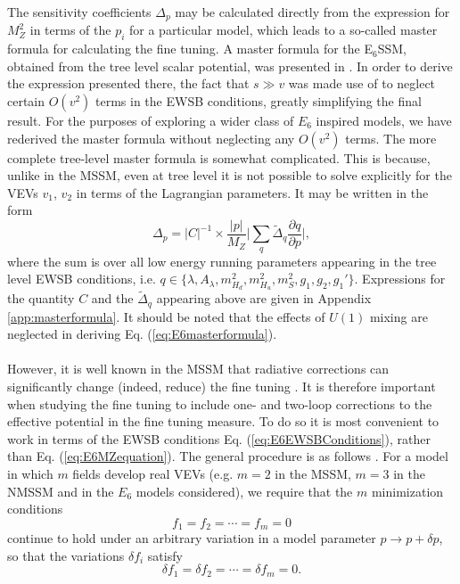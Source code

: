 \documentclass[preprint,amsmath,amssymb,aps,superscriptaddress,prd,showpacs,floatfix]{revtex4-1}
\newcommand{\be}{\begin{equation}}
\newcommand{\ee}{\end{equation}}
\begin{document}
The sensitivity coefficients $\Delta_p$ may be calculated directly from the expression for $M_Z^2$ in terms of the $p_i$ for a particular model, which leads to a so-called master formula for calculating the fine tuning. A master formula for the E$_6$SSM, obtained from the tree level scalar potential, was presented in \cite{Athron:2013ipa}. In order to derive the expression presented there, the fact that $s \gg v$ was made use of to neglect certain $O(v^2)$ terms in the EWSB conditions, greatly simplifying the final result. For the purposes of exploring a wider class of $E_6$ inspired models, we have rederived the master formula without neglecting any $O(v^2)$ terms. The more complete tree-level master formula is somewhat complicated. This is because, unlike in the MSSM, even at tree level it is not possible to solve explicitly for the VEVs $v_1$, $v_2$ in terms of the Lagrangian parameters. It may be written in the form
\be
\Delta_p=|C|^{-1}\times \frac{|p|}{M_Z}\bigg|\sum_{q}\tilde{\Delta}_q\frac{\partial q}{\partial p}\bigg|,
\label{eq:E6masterformula}
\ee
where the sum is over all low energy running parameters appearing in the tree level EWSB conditions, i.e. $q\in\{\lambda, A_\lambda, m_{H_d}^2,m_{H_u}^2,m_S^2,g_1,g_2,g_1'\}$. Expressions for the quantity $C$ and the $\tilde{\Delta}_q$ appearing above are given in Appendix \ref{app:masterformula}. It should be noted that the effects of $U(1)$ mixing are neglected in deriving Eq. (\ref{eq:E6masterformula}).\\ \\
However, it is well known in the MSSM that radiative corrections can significantly change (indeed, reduce) the fine tuning \cite{Cassel:2010px}. It is therefore important when studying the fine tuning to include one- and two-loop corrections to the effective potential in the fine tuning measure. To do so it is most convenient to work in terms of the EWSB conditions Eq. (\ref{eq:E6EWSBConditions}), rather than Eq. (\ref{eq:E6MZequation}). The general procedure is as follows \cite{Ellwanger:2011mu}. For a model in which $m$ fields develop real VEVs (e.g. $m=2$ in the MSSM, $m=3$ in the NMSSM and in the $E_6$ models considered), we require that the $m$ minimization conditions
\begin{equation}\label{eq:EWSBconditions}
f_1=f_2=\dotsb=f_m=0
\end{equation}
continue to hold under an arbitrary variation in a model parameter $p\rightarrow p+\delta p$, so that the variations $\delta f_i$ satisfy
\begin{equation}\label{eq:EWSBvariations}
\delta f_1 = \delta f_2=\dotsb =\delta f_m =0.
\end{equation}
\end{document}
